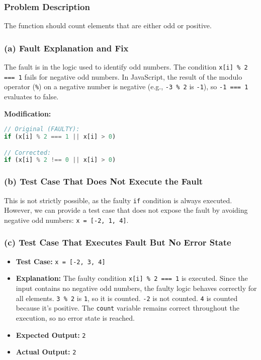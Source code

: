 \documentclass[11pt,a4paper]{article}
\begin{document}
\subsubsection{Problem Description}
The function should count elements that are either odd or positive.

\subsubsection{(a) Fault Explanation and Fix}

 The fault is in the logic used to identify odd numbers. The condition \texttt{x[i] \% 2 === 1} fails for negative odd numbers. In JavaScript, the result of the modulo operator (\texttt{\%}) on a negative number is negative (e.g., \texttt{-3 \% 2} is \texttt{-1}), so \texttt{-1 === 1} evaluates to false.

\textbf{Modification:}
\begin{lstlisting}[language=JavaScript]
// Original (FAULTY):
if (x[i] % 2 === 1 || x[i] > 0)

// Corrected:
if (x[i] % 2 !== 0 || x[i] > 0)
\end{lstlisting}

\subsubsection{(b) Test Case That Does Not Execute the Fault}

This is not strictly possible, as the faulty \texttt{if} condition is always executed. However, we can provide a test case that does not expose the fault by avoiding negative odd numbers: \texttt{x = [-2, 1, 4]}.

\subsubsection{(c) Test Case That Executes Fault But No Error State}

\begin{itemize}[leftmargin=*]
    \item \textbf{Test Case:} \texttt{x = [-2, 3, 4]}
    \item \textbf{Explanation:} The faulty condition \texttt{x[i] \% 2 === 1} is executed. Since the input contains no negative odd numbers, the faulty logic behaves correctly for all elements. \texttt{3 \% 2} is \texttt{1}, so it is counted. \texttt{-2} is not counted. \texttt{4} is counted because it's positive. The \texttt{count} variable remains correct throughout the execution, so no error state is reached.
    \item \textbf{Expected Output:} \texttt{2}
    \item \textbf{Actual Output:} \texttt{2}
\end{itemize}
\end{document}
